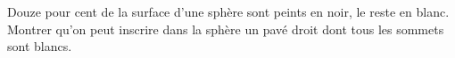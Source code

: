 Douze pour cent de la surface d'une sphère sont peints en noir, le reste en blanc. Montrer qu'on peut inscrire dans la sphère un pavé droit dont tous les sommets sont blancs.
